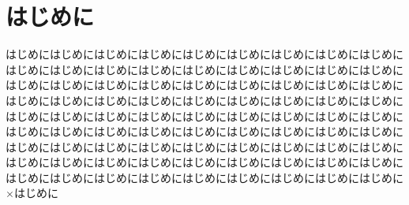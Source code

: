 

\section{はじめに} %
\label{sec:はじめに}

	はじめにはじめにはじめにはじめにはじめにはじめにはじめにはじめにはじめにはじめにはじめにはじめにはじめにはじめにはじめにはじめにはじめにはじめにはじめにはじめにはじめにはじめにはじめにはじめにはじめにはじめにはじめにはじめにはじめにはじめにはじめにはじめにはじめにはじめにはじめにはじめにはじめにはじめにはじめにはじめにはじめにはじめにはじめにはじめにはじめにはじめにはじめにはじめにはじめにはじめにはじめにはじめにはじめにはじめにはじめにはじめにはじめにはじめにはじめにはじめにはじめにはじめにはじめにはじめにはじめにはじめにはじめにはじめにはじめにはじめにはじめにはじめにはじめにはじめにはじめにはじめにはじめにはじめにはじめにはじめにはじめに$\times$はじめに


